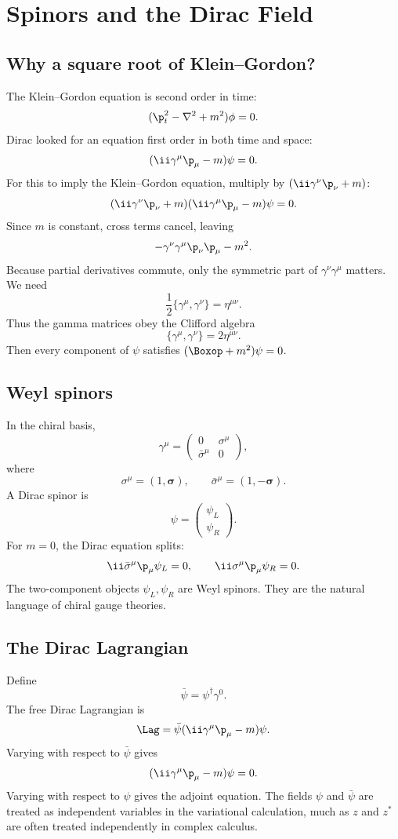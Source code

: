 \chapter{Spinors and the Dirac Field}

\section{Why a square root of Klein--Gordon?}

The Klein--Gordon equation is second order in time:
\[
  (\p_t^2-\nabla^2+m^2)\phi=0.
\]
Dirac looked for an equation first order in both time and space:
\[
  (\ii\gamma^\mu\p_\mu-m)\psi=0.
\]
For this to imply the Klein--Gordon equation, multiply by \((\ii\gamma^\nu\p_\nu+m)\):
\[
  (\ii\gamma^\nu\p_\nu+m)(\ii\gamma^\mu\p_\mu-m)\psi=0.
\]
Since \(m\) is constant, cross terms cancel, leaving
\[
  -\gamma^\nu\gamma^\mu\p_\nu\p_\mu-m^2.
\]
Because partial derivatives commute, only the symmetric part of \(\gamma^\nu\gamma^\mu\) matters.  We need
\[
  \frac12\{\gamma^\mu,\gamma^\nu\}=\eta^{\mu\nu}.
\]
Thus the gamma matrices obey the Clifford algebra
\[
  \{\gamma^\mu,\gamma^\nu\}=2\eta^{\mu\nu}.
\]
Then every component of \(\psi\) satisfies \((\Boxop+m^2)\psi=0\).

\section{Weyl spinors}

In the chiral basis,
\[
  \gamma^\mu=
  \begin{pmatrix}
  0&\sigma^\mu\\
  \bar\sigma^\mu&0
  \end{pmatrix},
\]
where
\[
  \sigma^\mu=(1,\bm\sigma),
  \qquad
  \bar\sigma^\mu=(1,-\bm\sigma).
\]
A Dirac spinor is
\[
  \psi=
  \begin{pmatrix}
  \psi_L\\
  \psi_R
  \end{pmatrix}.
\]
For \(m=0\), the Dirac equation splits:
\[
  \ii\bar\sigma^\mu\p_\mu\psi_L=0,
  \qquad
  \ii\sigma^\mu\p_\mu\psi_R=0.
\]
The two-component objects \(\psi_L,\psi_R\) are Weyl spinors.  They are the natural language of chiral gauge theories.

\section{The Dirac Lagrangian}

Define
\[
  \bar\psi=\psi^\dagger\gamma^0.
\]
The free Dirac Lagrangian is
\[
  \Lag=\bar\psi(\ii\gamma^\mu\p_\mu-m)\psi.
\]
Varying with respect to \(\bar\psi\) gives
\[
  (\ii\gamma^\mu\p_\mu-m)\psi=0.
\]
Varying with respect to \(\psi\) gives the adjoint equation.  The fields \(\psi\) and \(\bar\psi\) are treated as independent variables in the variational calculation, much as \(z\) and \(z^*\) are often treated independently in complex calculus.

